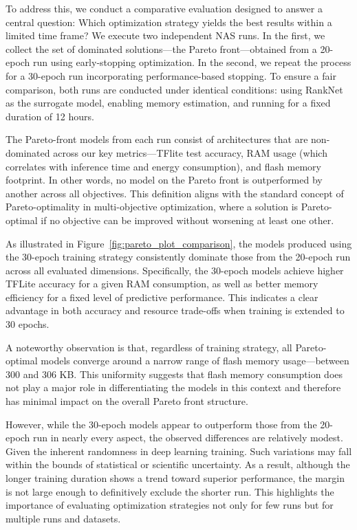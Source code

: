 To address this, we conduct a comparative evaluation designed to answer a central question: Which optimization strategy yields the best results within a limited time frame? We execute two independent NAS runs. In the first, we collect the set of dominated solutions—the Pareto front—obtained from a 20-epoch run using early-stopping optimization. In the second, we repeat the process for a 30-epoch run incorporating performance-based stopping. To ensure a fair comparison, both runs are conducted under identical conditions: using RankNet as the surrogate model, enabling memory estimation, and running for a fixed duration of 12 hours.

The Pareto-front models from each run consist of architectures that are non-dominated across our key metrics—TFlite test accuracy, RAM usage (which correlates with inference time and energy consumption), and flash memory footprint. In other words, no model on the Pareto front is outperformed by another across all objectives. This definition aligns with the standard concept of Pareto-optimality in multi-objective optimization, where a solution is Pareto-optimal if no objective can be improved without worsening at least one other. \cite{benson2008pareto}


As illustrated in Figure~\ref{fig:pareto_plot_comparison}, the models produced using the 30-epoch training strategy consistently dominate those from the 20-epoch run across all evaluated dimensions. Specifically, the 30-epoch models achieve higher TFLite accuracy for a given RAM consumption, as well as better memory efficiency for a fixed level of predictive performance. This indicates a clear advantage in both accuracy and resource trade-offs when training is extended to 30 epochs.

A noteworthy observation is that, regardless of training strategy, all Pareto-optimal models converge around a narrow range of flash memory usage—between 300 and 306 KB. This uniformity suggests that flash memory consumption does not play a major role in differentiating the models in this context and therefore has minimal impact on the overall Pareto front structure.

However, while the 30-epoch models appear to outperform those from the 20-epoch run in nearly every aspect, the observed differences are relatively modest. Given the inherent randomness in deep learning training. Such variations may fall within the bounds of statistical or scientific uncertainty. As a result, although the longer training duration shows a trend toward superior performance, the margin is not large enough to definitively exclude the shorter run. This highlights the importance of evaluating optimization strategies not only for few runs but for multiple runs and datasets.

